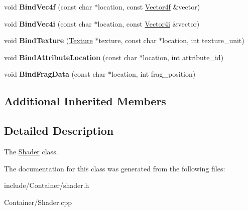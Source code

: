 \begin{DoxyCompactItemize}
\item 
\hypertarget{classEngine_1_1Shader_a5d999cd1952e19ff2ba31f9398195ceb}{}void {\bfseries Bind\+Vec4f} (const char $\ast$location, const \hyperlink{classVector4}{Vector4f} \&vector)\label{classEngine_1_1Shader_a5d999cd1952e19ff2ba31f9398195ceb}

\item 
\hypertarget{classEngine_1_1Shader_ad892a7e61b6556741fb6704076e8f806}{}void {\bfseries Bind\+Vec4i} (const char $\ast$location, const \hyperlink{classVector4}{Vector4i} \&vector)\label{classEngine_1_1Shader_ad892a7e61b6556741fb6704076e8f806}

\item 
\hypertarget{classEngine_1_1Shader_ae1e0209d240df2b89f34ec9e676c1209}{}void {\bfseries Bind\+Texture} (\hyperlink{classEngine_1_1Texture}{Texture} $\ast$texture, const char $\ast$location, int texture\+\_\+unit)\label{classEngine_1_1Shader_ae1e0209d240df2b89f34ec9e676c1209}

\item 
\hypertarget{classEngine_1_1Shader_a91c06a793941a96343674ab2fe4601d0}{}void {\bfseries Bind\+Attribute\+Location} (const char $\ast$location, int attribute\+\_\+id)\label{classEngine_1_1Shader_a91c06a793941a96343674ab2fe4601d0}

\item 
\hypertarget{classEngine_1_1Shader_a3f3967c2977707a1b3c53a1d498480cf}{}void {\bfseries Bind\+Frag\+Data} (const char $\ast$location, int frag\+\_\+position)\label{classEngine_1_1Shader_a3f3967c2977707a1b3c53a1d498480cf}

\end{DoxyCompactItemize}
\subsection*{Additional Inherited Members}


\subsection{Detailed Description}
The \hyperlink{classEngine_1_1Shader}{Shader} class. 

The documentation for this class was generated from the following files\+:\begin{DoxyCompactItemize}
\item 
include/\+Container/shader.\+h\item 
Container/Shader.\+cpp\end{DoxyCompactItemize}
